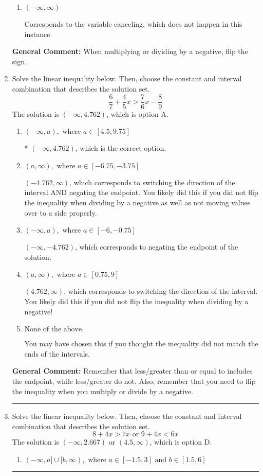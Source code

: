 \documentclass{extbook}[14pt]
\newcommand{\litem}[1]{\item #1

\rule{\textwidth}{0.4pt}}
\begin{document}
\begin{enumerate}
{\begin{enumerate}[label=\Alph*.]
Corresponds to inverting the inequality and negating the solution.
\item \( (-\infty, \infty) \)

Corresponds to the variable canceling, which does not happen in this instance.
\end{enumerate}

\textbf{General Comment:} When multiplying or dividing by a negative, flip the sign.
}
\litem{
Solve the linear inequality below. Then, choose the constant and interval combination that describes the solution set.
\[ \frac{6}{7} + \frac{4}{5} x > \frac{7}{6} x - \frac{8}{9} \]The solution is \( (-\infty, 4.762) \), which is option A.\begin{enumerate}[label=\Alph*.]
\item \( (-\infty, a), \text{ where } a \in [4.5, 9.75] \)

* $(-\infty, 4.762)$, which is the correct option.
\item \( (a, \infty), \text{ where } a \in [-6.75, -3.75] \)

 $(-4.762, \infty)$, which corresponds to switching the direction of the interval AND negating the endpoint. You likely did this if you did not flip the inequality when dividing by a negative as well as not moving values over to a side properly.
\item \( (-\infty, a), \text{ where } a \in [-6, -0.75] \)

 $(-\infty, -4.762)$, which corresponds to negating the endpoint of the solution.
\item \( (a, \infty), \text{ where } a \in [0.75, 9] \)

 $(4.762, \infty)$, which corresponds to switching the direction of the interval. You likely did this if you did not flip the inequality when dividing by a negative!
\item \( \text{None of the above}. \)

You may have chosen this if you thought the inequality did not match the ends of the intervals.
\end{enumerate}

\textbf{General Comment:} Remember that less/greater than or equal to includes the endpoint, while less/greater do not. Also, remember that you need to flip the inequality when you multiply or divide by a negative.
}
\litem{
Solve the linear inequality below. Then, choose the constant and interval combination that describes the solution set.
\[ 8 + 4 x > 7 x \text{ or } 9 + 4 x < 6 x \]The solution is \( (-\infty, 2.667) \text{ or } (4.5, \infty) \), which is option D.\begin{enumerate}[label=\Alph*.]
\item \( (-\infty, a] \cup [b, \infty), \text{ where } a \in [-1.5, 3] \text{ and } b \in [1.5, 6] \)


\end{enumerate}}
\end{enumerate}
\end{document}

